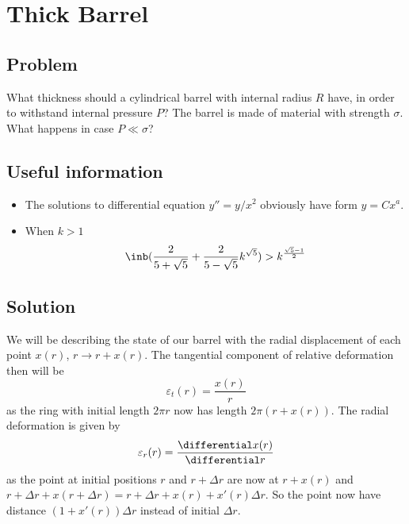 \section*{Thick Barrel}

\subsection*{Problem}
What thickness should a cylindrical barrel with internal radius $R$ have,
in order to withstand internal pressure $P$?
The barrel is made of material with strength $\sigma$.
What happens in case $P \ll \sigma$?

\subsection*{Useful information}
\begin{itemize}
    \item The solutions to differential equation $y'' = y / x^2$
        obviously have form $y = C x^a$.
    \item When $k>1$
        \begin{equation*}
            \inb({\frac{2}{5 + \sqrt{5}} + \frac{2}{5 - \sqrt{5}} k^{\sqrt{5}}}) > k^{\frac{\sqrt{5} - 1}{2}}
        \end{equation*}
\end{itemize}

\subsection*{Solution}

We will be describing the state of our barrel
with the radial displacement of each point $x(r)$,
$r \rightarrow r + x(r)$.
The tangential component of relative deformation then will be
\begin{equation}
    \varepsilon_t(r) = \frac{x(r)}{r}
\end{equation}
as the ring with initial length $2\pi r$ now has length $2\pi (r + x(r))$.
The radial deformation is given by
\begin{equation}
    \varepsilon_r(r) = \frac{\differential x(r)}{\differential r}
\end{equation}
as the point at initial positions $r$ and $r + \Delta r$ are now at
$r + x(r)$ and $r + \Delta r + x(r + \Delta r) = r + \Delta r + x(r) + x'(r) \Delta r$.
So the point now have distance $(1 + x'(r)) \Delta r$ instead of initial $\Delta r$.

